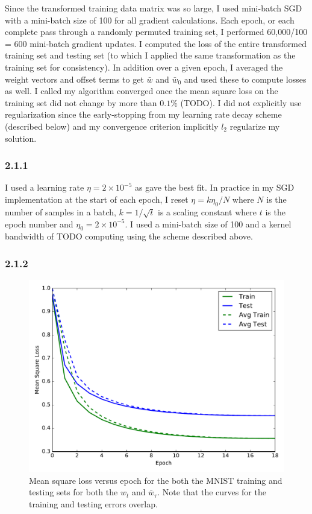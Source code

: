 \documentclass[12pt]{amsart}
\begin{document}
Since the transformed training data matrix was so large, I used mini-batch SGD with a mini-batch size of 100 for all gradient calculations.  Each epoch, or each complete pass through a randomly permuted training set, I performed 60,000/100 = 600 mini-batch gradient updates.  I computed the loss of the entire transformed training set and testing set (to which I applied the same transformation as the training set for consistency).  In addition over a given epoch, I averaged the weight vectors and offset terms to get $\bar{w}$ and $\bar{w}_0$ and used these to compute losses as well.  I called my algorithm converged once the mean square loss on the training set did not change by more than $0.1\%$ (TODO).  I did not explicitly use regularization since the early-stopping from my learning rate decay scheme (described below) and my convergence criterion implicitly $l_2$ regularize my solution.

\subsubsection*{2.1.1}

I used a learning rate $\eta = 2 \times 10^{-5}$ as gave the best fit.  In practice in my SGD implementation at the start of each epoch, I reset $\eta = k\eta_0/N$ where $N$ is the number of samples in a batch, $k = 1/\sqrt{t}$ is a scaling constant where $t$ is the epoch number and $\eta_0 = 2 \times 10^{-5}$.  I used a mini-batch size of 100 and a kernel bandwidth of TODO computing using the scheme described above.

\subsubsection*{2.1.2}

\begin{figure}[H]
	\includegraphics[width=\columnwidth]{pca_square_loss.pdf}
    \caption{Mean square loss versus epoch for the both the MNIST training and testing sets for both the $w_t$ and $\bar{w}_{\tau}$. Note that the curves for the training and testing errors overlap.}
    \label{fig:pca_square_loss}
\end{figure}
\end{document}
